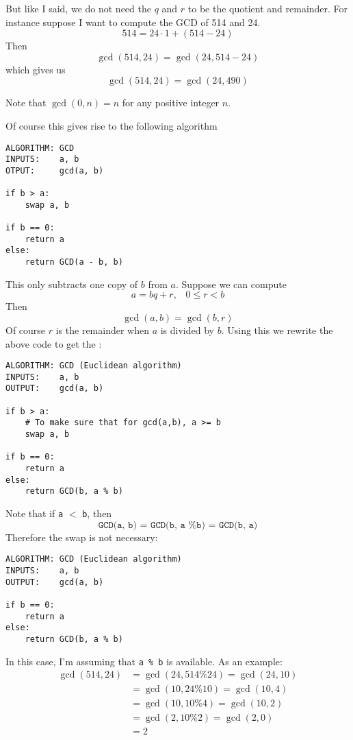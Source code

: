 But like I said, we do not need the $q$ and $r$ to be the quotient
and remainder.
For instance suppose I want to compute the GCD of 514 and 24.
\[
514 = 24 \cdot 1 + (514 - 24)
\]
Then 
\[
\gcd(514, 24) = \gcd(24, 514 - 24)
\]
which gives us
\[
\gcd(514, 24) = \gcd(24, 490)
\]

Note that $\gcd(0, n) = n$ for any positive integer $n$.

Of course this gives rise to the following algorithm
\begin{Verbatim}[frame=single,fontsize=\footnotesize]
ALGORITHM: GCD
INPUTS:    a, b
OTPUT:     gcd(a, b)

if b > a:
    swap a, b

if b == 0:
    return a
else:
    return GCD(a - b, b) 
\end{Verbatim}

This only subtracts one copy of $b$ from $a$.
Suppose we can compute
\[
a = bq + r, \,\,\,\,\, 0 \leq r < b
\]
Then
\[
\gcd(a, b) = \gcd(b, r) 
\]
Of course $r$ is the remainder when $a$ is divided by $b$.
Using this we rewrite the above code to get
the
:
\begin{Verbatim}[frame=single,fontsize=\footnotesize]
ALGORITHM: GCD (Euclidean algorithm)
INPUTS:    a, b
OUTPUT:    gcd(a, b)

if b > a:
    # To make sure that for gcd(a,b), a >= b
    swap a, b

if b == 0: 
    return a
else:
    return GCD(b, a % b)
\end{Verbatim}
Note that if \verb!a! $<$ \verb!b!, then
\[
\texttt{GCD(a, b) = GCD(b, a \% b) = GCD(b, a)}
\]
Therefore the swap is not necessary:
\begin{Verbatim}[frame=single,fontsize=\footnotesize]
ALGORITHM: GCD (Euclidean algorithm)
INPUTS:    a, b
OUTPUT:    gcd(a, b)

if b == 0: 
    return a
else:
    return GCD(b, a % b)
\end{Verbatim}
In this case, I'm assuming that \verb!a % b! is available.
As an example:
\begin{align*}
  \gcd(514, 24)
  &= \gcd(24, 514 \% 24) = \gcd(24, 10) \\
  &= \gcd(10, 24 \% 10) = \gcd(10, 4) \\
  &= \gcd(10, 10 \% 4) = \gcd(10, 2) \\
  &= \gcd(2, 10 \% 2) = \gcd(2, 0) \\
  &= 2
\end{align*}

